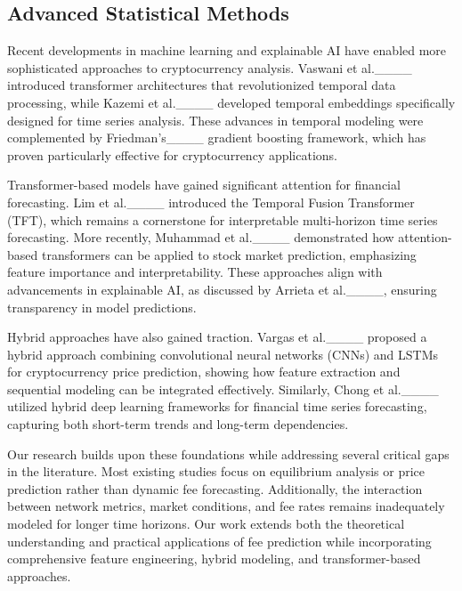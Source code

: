 \subsection{Advanced Statistical Methods}
Recent developments in machine learning and explainable AI have enabled more sophisticated approaches to cryptocurrency analysis. Vaswani et al.____ introduced transformer architectures that revolutionized temporal data processing, while Kazemi et al.____ developed temporal embeddings specifically designed for time series analysis. These advances in temporal modeling were complemented by Friedman's____ gradient boosting framework, which has proven particularly effective for cryptocurrency applications.

Transformer-based models have gained significant attention for financial forecasting. Lim et al.____ introduced the Temporal Fusion Transformer (TFT), which remains a cornerstone for interpretable multi-horizon time series forecasting. More recently, Muhammad et al.____ demonstrated how attention-based transformers can be applied to stock market prediction, emphasizing feature importance and interpretability. These approaches align with advancements in explainable AI, as discussed by Arrieta et al.____, ensuring transparency in model predictions.

Hybrid approaches have also gained traction. Vargas et al.____ proposed a hybrid approach combining convolutional neural networks (CNNs) and LSTMs for cryptocurrency price prediction, showing how feature extraction and sequential modeling can be integrated effectively. Similarly, Chong et al.____ utilized hybrid deep learning frameworks for financial time series forecasting, capturing both short-term trends and long-term dependencies.

Our research builds upon these foundations while addressing several critical gaps in the literature. Most existing studies focus on equilibrium analysis or price prediction rather than dynamic fee forecasting. Additionally, the interaction between network metrics, market conditions, and fee rates remains inadequately modeled for longer time horizons. Our work extends both the theoretical understanding and practical applications of fee prediction while incorporating comprehensive feature engineering, hybrid modeling, and transformer-based approaches.